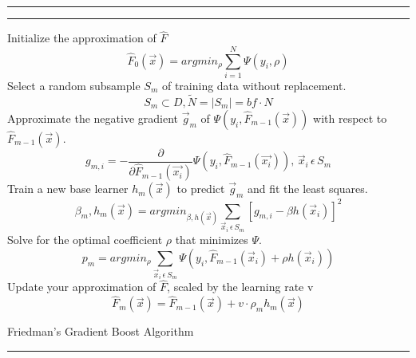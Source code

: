 \documentclass[conference]{IEEEtran}
\begin{document}
\begin{algorithm}[]
	\rule{\textwidth}{2pt}
	
	\rule{\textwidth}{.5pt}
	Initialize the  approximation of \(\hat{F}\)
	\begin{equation}
	\hat{F}_0(\vec{x}) = argmin_\rho \sum_{i=1}^{N}\Psi(y_i, \rho) 
	\end{equation}
	{
		Select a random subsample \(S_m\) of training data without replacement.
		\begin{equation}
		S_m \subset D,  \tilde{N} = |S_m| = bf  \cdot  N 
		\end{equation}
		Approximate the negative gradient \(\vec{g}_m\) of \(\Psi(y_i, \hat{F}_{m-1} (\vec{x}) ) \) with respect to \(\hat{F}_{m-1} (\vec{x})\).
		\begin{equation}
		g_{m,i} = -\frac{\partial}{\partial \hat{F}_{m-1}(\vec{x_i})} \Psi(y_i, \hat{F}_{m-1}(\vec{x_i})), \, \vec{x}_i \, \epsilon \, S_m
		\label{eq:NegativeGradient}
		\end{equation}
		Train a new base learner \(h_m(\vec{x})\) to predict \(\vec{g}_m\) and fit the least squares.
		\begin{equation}
		\beta_m, h_m(\vec{x}) = argmin_{\beta, h(\vec{x})}\sum_{\vec{x}_i \, \epsilon \, S_m}[ g_{m,i} - \beta h(\vec{x}_i)]^2
		\label{eq:NewBaseLearner}
		\end{equation}		
		Solve for the optimal coefficient \(\rho\) that minimizes \(\Psi\).
		\begin{equation}
		p_m = argmin_\rho \sum_{\vec{x}_i \, \epsilon \, S_m}\Psi(y_i, \hat{F}_{m-1}(\vec{x}_i) + \rho h(\vec{x}_i))
		\label{eq:ScalingCoefficent}
		\end{equation}
		Update your approximation of \(\hat{F}\), scaled by the learning rate v
		\begin{equation}
		\hat{F}_m(\vec{x}) = \hat{F}_{m-1}(\vec{x}) + v  \cdot  \rho_m h_m(\vec{x})
		\label{eq:UpdateStep}
		\end{equation}
	}
	\caption{Friedman's Gradient Boost Algorithm  \cite{2001Friedman} \cite{GBMTut} \cite{2002Friedman} \cite{death2007ABT}}
	\rule{\textwidth}{2pt}
	\label{alg:GeneralGradientBoost}
\end{algorithm}
\end{document}
